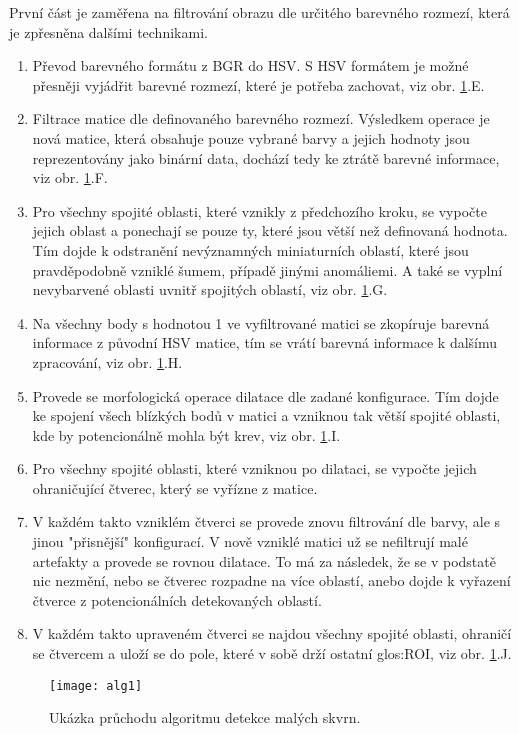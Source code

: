První část je zaměřena na filtrování obrazu dle určitého barevného rozmezí, která je zpřesněna dalšími technikami.
\begin{enumerate}
	\item Převod barevného formátu z BGR do HSV. S HSV formátem je možné přesněji vyjádřit barevné rozmezí, které je potřeba zachovat, viz obr. \ref{fig:alg_1}.E.
	\item Filtrace matice dle definovaného barevného rozmezí. Výsledkem operace je nová matice, která obsahuje pouze vybrané barvy a jejich hodnoty jsou reprezentovány jako binární data, dochází tedy ke ztrátě barevné informace, viz obr. \ref{fig:alg_1}.F.
	\item Pro všechny spojité oblasti, které vznikly z předchozího kroku, se vypočte jejich oblast a ponechají se pouze ty, které jsou větší než definovaná hodnota. Tím dojde k odstranění nevýznamných miniaturních oblastí, které jsou pravděpodobně vzniklé šumem, případě jinými anomáliemi. A také se vyplní nevybarvené oblasti uvnitř spojitých oblastí, viz obr. \ref{fig:alg_1}.G.
	\item Na všechny body s hodnotou 1 ve vyfiltrované matici se zkopíruje barevná informace z původní HSV matice, tím se vrátí barevná informace k dalšímu zpracování, viz obr. \ref{fig:alg_1}.H.
	\item Provede se morfologická operace dilatace dle zadané konfigurace. Tím dojde ke spojení všech blízkých bodů v matici a vzniknou tak větší spojité oblasti, kde by potencionálně mohla být krev, viz obr. \ref{fig:alg_1}.I.
	\item Pro všechny spojité oblasti, které vzniknou po dilataci, se vypočte jejich ohraničující čtverec, který se vyřízne z matice.
	\item V každém takto vzniklém čtverci se provede znovu filtrování dle barvy, ale s jinou "přisnější" konfigurací. V nově vzniklé matici už se nefiltrují malé artefakty a provede se rovnou dilatace. To má za následek, že se v podstatě nic nezmění, nebo se čtverec rozpadne na více oblastí, anebo dojde k vyřazení čtverce z potencionálních detekovaných oblastí.
	\item V každém takto upraveném čtverci se najdou všechny spojité oblasti, ohraničí se čtvercem a uloží se do pole, které v sobě drží ostatní \gls{glos:ROI}, viz obr. \ref{fig:alg_1}.J.
\end{enumerate}

\begin{figure}[h]
	\texttt{[image: alg1]}
	\centering
	\caption{Ukázka průchodu algoritmu detekce malých skvrn. \label{fig:alg_1}}
\end{figure} 
\FloatBarrier


